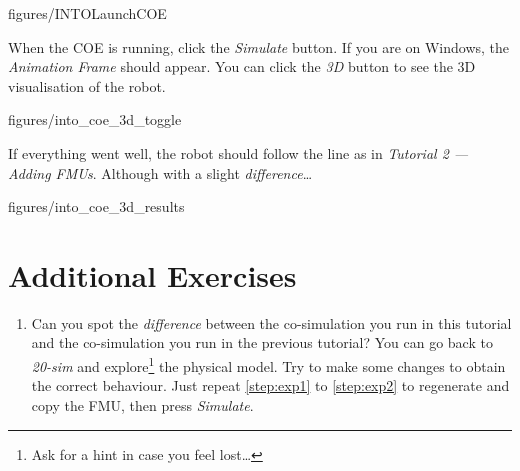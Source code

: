\documentclass[11pt,a4paper]{../tutorial}
\begin{document}
\begin{instructions}
    \begin{annotation}[width=0.85\linewidth,trim=0 270 0 120,clip]{figures/INTOLaunchCOE}
    \end{annotation}

\item When the COE is running, click the \emph{Simulate} button. If you are on Windows, the \emph{Animation Frame} should appear. You can click the \emph{3D} button to see the 3D visualisation of the robot.

    \begin{annotation}[width=0.55\linewidth,trim=0 0 0 0,clip]{figures/into_coe_3d_toggle}
    \end{annotation}

\item If everything went well, the robot should follow the line as in \emph{Tutorial 2 --- Adding FMUs}. Although with a slight \emph{difference}\ldots

    \begin{annotation}[width=0.55\linewidth,trim=0 300 0 0,clip]{figures/into_coe_3d_results}
    \end{annotation}

\end{instructions}

\section{Additional Exercises}

\begin{enumerate}
	\item Can you spot the \emph{difference} between the co-simulation you run in this tutorial and the co-simulation you run in the previous tutorial? You can go back to \emph{20-sim} and explore\footnote{Ask for a hint in case you feel lost\ldots} the physical model. Try to make some changes to obtain the correct behaviour. Just repeat \ref{step:exp1} to \ref{step:exp2} to regenerate and copy the FMU, then press \emph{Simulate}.
\end{enumerate}
\end{document}
